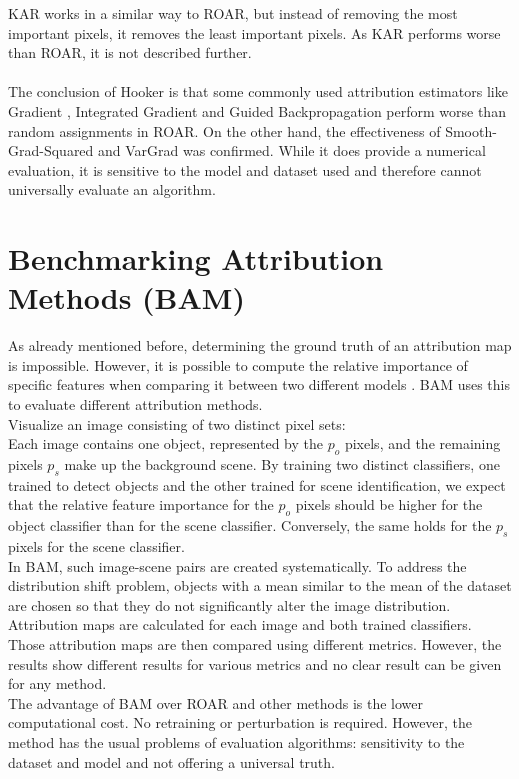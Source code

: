 KAR works in a similar way to ROAR, but instead of removing the most important pixels, it removes the least important pixels. As KAR performs worse than ROAR, it is not described further.\\
\\
The conclusion of Hooker \cite{hooker2019benchmark} is that some commonly used attribution estimators like Gradient \cite{simonyan2014deep}, Integrated Gradient \cite{sundararajan2017axiomatic} and Guided Backpropagation \cite{springenberg2015striving} perform worse than random assignments in ROAR. On the other hand, the effectiveness of Smooth-Grad-Squared and VarGrad was confirmed. While it does provide a numerical evaluation, it is sensitive to the model and dataset used and therefore cannot universally evaluate an algorithm.

\section{Benchmarking Attribution Methods (BAM)}
\label{sec:bam}

As already mentioned before, determining the ground truth of an attribution map is impossible. However, it is possible to compute the relative importance of specific features when comparing it between two different models \cite{yang2019benchmarking}. BAM \cite{yang2019benchmarking} uses this to evaluate different attribution methods.
\\
Visualize an image consisting of two distinct pixel sets:\\ 
Each image contains one object, represented by the $p_o$ pixels, and the remaining pixels $p_s$ make up the background scene. By training two distinct classifiers, one trained to detect objects and the other trained for scene identification, we expect that the relative feature importance for the $p_o$ pixels should be higher for the object classifier than for the scene classifier. Conversely, the same holds for the $p_s$ pixels for the scene classifier.\\
In BAM, such image-scene pairs are created systematically. To address the distribution shift problem, objects with a mean similar to the mean of the dataset are chosen so that they do not significantly alter the image distribution. Attribution maps are calculated for each image and both trained classifiers. Those attribution maps are then compared using different metrics. However, the results show different results for various metrics and no clear result can be given for any method.\\
The advantage of BAM over ROAR \cite{hooker2019benchmark} and other methods is the lower computational cost. No retraining or perturbation is required. However, the method has the usual problems of evaluation algorithms: sensitivity to the dataset and model and not offering a universal truth.


